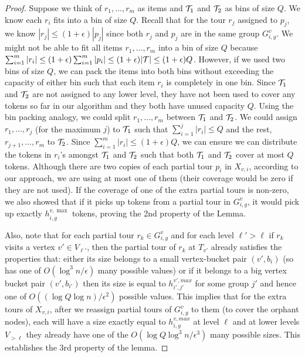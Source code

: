 \documentclass[twoside,leqno]{article}
\newcommand{\calT}{{\cal T}}
\newcommand{\eps}{\epsilon}
\begin{document}
\begin{proof}
Suppose we think of $r_1, \ldots, r_m$ as items and $\calT_1$ and $\calT_2$ as bins of size $Q$. We know each $r_i$ fits into a bin of size $Q$. Recall that for the tour $r_j$ assigned to $p_j$, we know $|r_j| \le (1 + \eps)|p_j|$ since both $r_j$ and $p_j$ are in the same group  $G^v_{i,g}$. We might not be able to fit all items $r_1, \ldots, r_m$ into a bin of size $Q$ because $\sum_{i = 1}^m|r_i| \le (1 + \eps)\sum_{i = 1}^m |p_i| \le (1 + \eps)|\calT| \le (1 + \eps)Q$. However, if we used two bins of size $Q$, we can pack the items into both bins without exceeding the capacity of either bin such that each item $r_i$ is completely in one bin. Since $\calT_1$ and $\calT_2$ are not assigned to any lower level, they have not been used to cover any tokens so far in our algorithm and they both have unused capacity $Q$. Using the bin packing analogy, we could split $r_1, \ldots, r_m$ between $\calT_1$ and $\calT_2$. We could assign $r_1, \ldots, r_j$ (for the maximum $j$) to $\calT_1$ such that $\sum_{i = 1}^j |r_i| \le Q$ and the rest, $r_{j+1}, \ldots, r_m$ to $\calT_2$. Since $\sum_{i = 1}^m |r_i| \le (1 + \eps)Q$, we can ensure we can distribute the tokens in $r_i$'s amongst $\calT_1$ and $\calT_2$ such that both $\calT_1$ and $\calT_2$ cover at most $Q$ tokens. Although there are two copies of each partial tour $p_i$ in $X_{v,i}$, according to our approach, we are using at most one of them (their coverage would be zero if they are not used). If the coverage of one of the extra partial tours is non-zero, we also showed that if it picks up tokens from a partial tour in $G^v_{i,g}$, it would pick up exactly $h^{v,\max}_{i,g}$ tokens, proving the 2nd property of the  Lemma. 

Also, note that for each partial tour $r_k\in G^v_{i,g}$ and for each level $\ell'>\ell$ if $r_k$ visits a vertex $v'\in V_{\ell'}$,
then the partial tour of $r_k$ at $T_{v'}$ already satisfies the properties that: either its size belongs to a small vertex-bucket
pair $(v',b_i)$ (so has one of $O(\log^3 n/\eps)$ many possible values) or if it belongs to a big
vertex bucket pair $(v',b_{i'})$ then its size is equal to $h^{v',max}_{i',j'}$ for some group $j'$ and hence one of
$O((\log Q\log n)/\eps^2)$ possible values.
This implies that for the extra tours of $X_{v,i}$, after we reassign partial
tours of $G^v_{i,g}$ to them (to cover the orphant nodes), each will have a size exactly equal to $h^{v,max}_{i,g}$ at level $\ell$
and at lower levels $V_{>\ell}$ they already have one of the $O(\log Q\log^3 n/\eps^3)$ many possible sizes. This establishes the 3rd property of the lemma.
\end{proof} 
\end{document}
